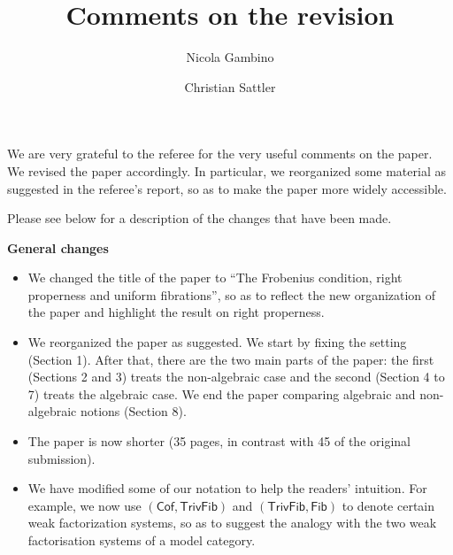 \documentclass[reqno,10pt,a4paper,oneside,draft]{amsart}
\begin{document}
\title{Comments on the revision} 

\author{Nicola Gambino \and Christian Sattler} 

\maketitle

We are very grateful to the referee for the very useful comments on the paper. We revised the paper accordingly. In particular, we reorganized some material
as suggested in the referee's report, so as to make the paper more  widely accessible. 

Please see below for a description of the changes that have been made.

{\bf General changes}
\begin{itemize} 
\item We changed the title of the paper to ``The Frobenius condition, right properness and uniform fibrations'', so as to reflect the new organization of
the paper and highlight the result on right properness. 
\item We reorganized the paper as suggested. We start 
by fixing the setting (Section 1). After that, there are the two main parts of the paper: the first (Sections 2 and 3) treats the
non-algebraic case and the second (Section 4 to 7) treats the algebraic case.
We end the paper comparing algebraic and non-algebraic notions (Section 8). 
\item The paper is now shorter (35 pages, in contrast with 45 of the original submission).
\item We have modified some of our notation to help the readers' intuition. For example, we now use $(\mathsf{Cof}, \mathsf{TrivFib})$ and $(\mathsf{TrivFib}, \mathsf{Fib})$ to denote
certain weak factorization systems, so as to suggest the analogy with the two weak factorisation systems of a model category.
\end{itemize}
\end{document}
